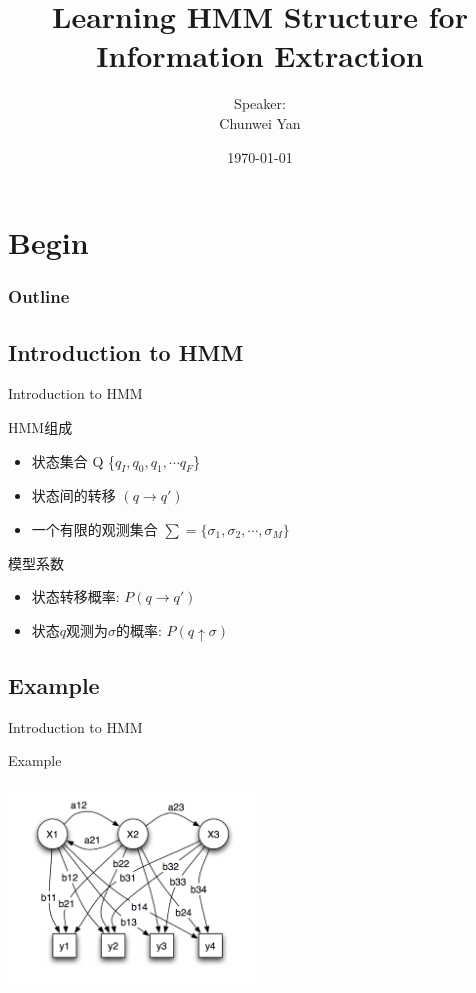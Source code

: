 \documentclass{beamer}
\title{Learning HMM Structure for Information Extraction}
\author{Speaker:\\Chunwei Yan}
\institute[PKUSZ]{
    互联网研发中心\\
}
\date{\today}
\begin{document}
\begin{frame}
  \titlepage
\end{frame}

\section{Begin}
\begin{frame}
\frametitle{Outline}
\tableofcontents
\end{frame}

\subsection{Introduction to HMM}
\begin{frame}{Introduction to HMM}
\begin{block}{HMM组成 }
    \begin{itemize}
        \item 状态集合 Q \{$q_I, q_0, q_1, \cdots q_F$\}
        \item 状态间的转移 $(q \rightarrow q')$
        \item 一个有限的观测集合 $\sum = \{ \sigma_1, \sigma_2, \cdots, \sigma_M\}$
    \end{itemize}
\end{block}

\begin{block}{模型系数}
\begin{itemize}
    \item 状态转移概率: $P(q \rightarrow q')$
    \item 状态$q$观测为$\sigma$的概率: $P(q \uparrow \sigma)$ 
\end{itemize}
\end{block}
\end{frame}

\subsection{Example}
\begin{frame}{Introduction to HMM}
\begin{block}{Example}
\begin{center}
    \includegraphics[height=150pt]{report5/hmm.png}
\end{center}
\end{block}
\end{frame}
\end{document}
